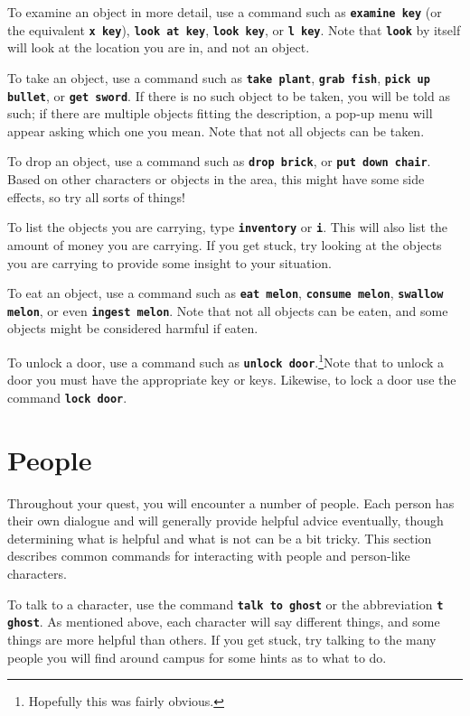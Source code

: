 \documentclass{report}
\begin{document}
To examine an object in more detail, use a command such as {\tt \bf examine key} (or the equivalent {\tt \bf x key}), {\tt \bf look at key}, {\tt \bf look key}, or {\tt \bf l key}. Note that {\tt \bf look} by itself will look at the location you are in, and not an object.

To take an object, use a command such as {\tt \bf take plant}, {\tt \bf grab fish}, {\tt \bf pick up bullet}, or {\tt \bf get sword}. If there is no such object to be taken, you will be told as such; if there are multiple objects fitting the description, a pop-up menu will appear asking which one you mean. Note that not all objects can be taken.

To drop an object, use a command such as {\tt \bf drop brick}, or {\tt \bf put down chair}. Based on other characters or objects in the area, this might have some side effects, so try all sorts of things!

To list the objects you are carrying, type {\tt \bf inventory} or {\tt \bf i}. This will also list the amount of money you are carrying. If you get stuck, try looking at the objects you are carrying to provide some insight to your situation.

To eat an object, use a command such as {\tt \bf eat melon}, {\tt \bf consume melon}, {\tt \bf swallow melon}, or even {\tt \bf ingest melon}. Note that not all objects can be eaten, and some objects might be considered harmful if eaten.

To unlock a door, use a command such as {\tt \bf unlock door}.\footnote{Hopefully this was fairly obvious.}Note that to unlock a door you must have the appropriate key or keys.  Likewise, to lock a door use the command {\tt \bf lock door}.

\section{People}
Throughout your quest, you will encounter a number of people. Each person has their own dialogue and will generally provide helpful advice eventually, though determining what is helpful and what is not can be a bit tricky. This section describes common commands for interacting with people and person-like characters.

To talk to a character, use the command {\tt \bf talk to ghost} or the abbreviation {\tt \bf t ghost}. As mentioned above, each character will say different things, and some things are more helpful than others. If you get stuck, try talking to the many people you will find around campus for some hints as to what to do.
\end{document}
